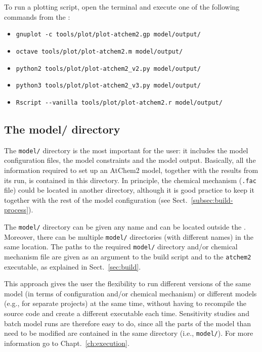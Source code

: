 To run a plotting script, open the terminal and execute one of the
following commands from the \maindir:

\begin{itemize}
\item \verb|gnuplot -c tools/plot/plot-atchem2.gp model/output/|
\item \verb|octave tools/plot/plot-atchem2.m model/output/|
\item \verb|python2 tools/plot/plot-atchem2_v2.py model/output/|
\item \verb|python3 tools/plot/plot-atchem2_v3.py model/output/|
\item \verb|Rscript --vanilla tools/plot/plot-atchem2.r model/output/|
\end{itemize}

\subsection{The model/ directory} \label{subsec:model-directory}

The \texttt{model/} directory is the most important for the user: it
includes the model configuration files, the model constraints and the
model output. Basically, all the information required to set up an
AtChem2 model, together with the results from its run, is contained in
this directory. In principle, the chemical mechanism (\texttt{.fac}
file) could be located in another directory, although it is good
practice to keep it together with the rest of the model configuration
(see Sect.~\ref{subsec:build-process}).

The \texttt{model/} directory can be given any name and can be located
outside the \maindir. Moreover, there can be multiple \texttt{model/}
directories (with different names) in the same location. The paths to
the required \texttt{model/} directory and/or chemical mechanism file
are given as an argument to the build script and to the
\texttt{atchem2} executable, as explained in Sect.~\ref{sec:build}.

This approach gives the user the flexibility to run different versions
of the same model (in terms of configuration and/or chemical
mechanism) or different models (e.g., for separate projects) at the
same time, without having to recompile the source code and create a
different executable each time. Sensitivity studies and batch model
runs are therefore easy to do, since all the parts of the model than
need to be modified are contained in the same directory (i.e.,
\texttt{model/}). For more information go to Chapt.~\ref{ch:execution}.
